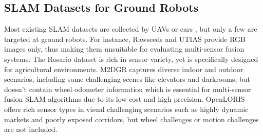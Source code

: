 \documentclass[conference]{IEEEtran}
\begin{document}





\subsection{SLAM Datasets for Ground Robots}

	
Most existing SLAM datasets are collected by UAVs \cite{burri2016euroc} or cars \cite{ligocki2020brno}, but only a few are targeted at ground robots. For instance, Rawseeds \cite{bonarini2006rawseeds} and UTIAS\cite{leung2011utias} provide RGB images only, thus making them unsuitable for evaluating multi-sensor fusion systems. The Rosario dataset \cite{doi:10.1177/0278364919841437} is rich in sensor variety, yet is specifically designed for agricultural environments. M2DGR \cite{yin2021m2dgr} captures diverse indoor and outdoor scenarios, including some challenging scenes like elevators and darkrooms, but doesn't contain wheel odometer information which is essential for multi-sensor fusion SLAM algorithms due to its low cost and high precision. OpenLORIS\cite{shi2020we} offers rich sensor types in visual challenging scenarios such as highly dynamic markets and poorly exposed corridors, but wheel challenges or motion challenges are not included.
\end{document}

